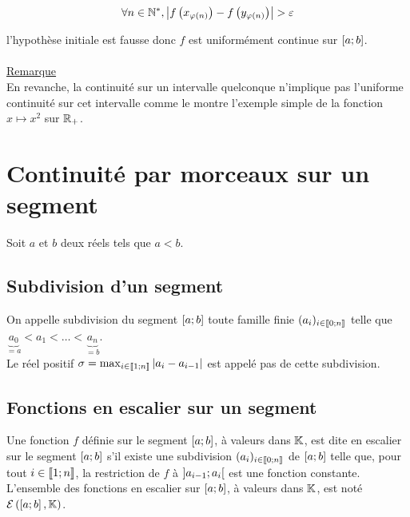 \begin{dem}
\begin{itemize}
        \[\forall n \in \mathbb{N}^*, \left\lvert f\left(x_{\varphi(n)}\right) - f\left( y_{\varphi(n)}\right)\right\rvert > \varepsilon\]
    \end{itemize}
    \conclusion l’hypothèse initiale est fausse donc \(f\) est uniformément continue sur \(\left[a;b\right]\).\\~\\
    \underline{Remarque}\\
    En revanche, la continuité sur un intervalle quelconque n’implique pas l’uniforme continuité sur cet intervalle comme le montre l’exemple simple de la fonction \(x \mapsto x^2\) sur \(\mathbb{R}_+\).
\end{dem}

\section{Continuité par morceaux sur un segment}
    Soit \(a\) et \(b\) deux réels tels que \(a < b\).
\subsection{Subdivision d’un segment}
\begin{defprop}
    On appelle subdivision du segment \(\left[a;b\right]\) toute famille finie \((a_i)_{i\in \left\llbracket0;n\right\rrbracket}\) telle que \(\underbrace{a_0}_{=a}< a_1 < \dots < \underbrace{a_n}_{=b}\). \\
    Le réel positif \(\sigma = \max_{i\in \left\llbracket1;n\right\rrbracket} \left\lvert a_i -  a_{i- 1}\right\rvert\) est appelé pas de cette subdivision.
\end{defprop}
\subsection{Fonctions en escalier sur un segment}
\begin{defprop}
    Une fonction \(f\) définie sur le segment \(\left[a;b\right]\), à valeurs dans \(\mathbb{K}\), est dite en escalier sur le segment \(\left[a;b\right]\) s’il existe une subdivision \((a_i)_{i\in \left\llbracket0;n\right\rrbracket}\) de \(\left[a;b\right]\) telle que, pour tout \(i \in  \left\llbracket1;n\right\rrbracket\), la restriction de \(f\) à \(\left]a_{i-1};a_i\right[\) est une fonction constante. \\
    L’ensemble des fonctions en escalier sur \(\left[a;b\right]\), à valeurs dans \(\mathbb{K}\), est noté \(\mathcal{E}\left(\left[a;b\right] , \mathbb{K}\right)\).
\end{defprop}

